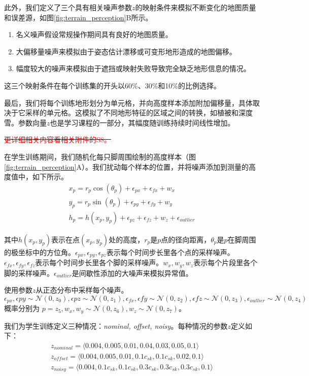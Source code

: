   此外，我们定义了三个具有相关噪声参数$z$的映射条件来模拟不断变化的地图质量和误差源，如图\ref{fig:terrain_perception}B所示。
  \begin{enumerate}
    \item 名义噪声假设常规操作期间具有良好的地图质量。
    \item 大偏移量噪声来模拟由于姿态估计漂移或可变形地形造成的地图偏移。
    \item 幅度较大的噪声来模拟由于遮挡或映射失败导致完全缺乏地形信息的情况。
  \end{enumerate}
  
  这三个映射条件在每个训练集的开头以60\%、30\%和10\%的比例选择。
  
  最后，我们将每个训练地形划分为单元格，并向高度样本添加附加偏移量，具体取决于它采样的单元格。这模拟了不同地形特征的区域之间的转换，如植被和深度雪。参数向量$z$也是学习课程的一部分，其幅度随训练持续时间线性增加。
  
  \sout{\textcolor{red}{\small 更详细相关内容看相关附件的S8。}}
  
  在学生训练期间，我们随机化每只脚周围绘制的高度样本（图\ref{fig:terrain_perception}A）。我们扰动每个样本的位置，并将噪声添加到测量的高度值中，如下所示。
  \begin{align}
    x_p=r_p\cos(\theta_p)+\epsilon_{px}+\epsilon_{fx}+w_x\\
    y_p=r_p\sin(\theta_p)+\epsilon_{py}+\epsilon_{fy}+w_y\\
    h_p=h(x_p,y_p)+\epsilon_{pz}+\epsilon_{fz}+w_z+\epsilon_{outlier}
  \end{align}
  
  其中$h(x_p,y_p)$表示在点$(x_p,y_p)$处的高度，$r_p$是$p$点的径向距离，$\theta_p$是$p$在脚周围的极坐标中的方位角。$\epsilon_{px},\epsilon_{py},\epsilon_{pz}$表示每个时间步长里各个点的采样噪声。$\epsilon_{fx},\epsilon_{fy},\epsilon_{fz}$表示每个时间步长里各个脚的采样噪声。$w_x, w_y, w_z$表示每个片段里各个脚的采样噪声。$\epsilon_{outlier}$是间歇性添加的大噪声来模拟异常值。
  
  使用参数$z$从正态分布中采样每个噪声。$\epsilon_{px},\epsilon{py}\sim \mathcal{N}(0,z_0), \epsilon{pz}\sim \mathcal{N}(0,z_1), \epsilon_{fx},\epsilon{fy}\sim \mathcal{N}(0,z_2), \epsilon{fz}\sim \mathcal{N}(0,z_3), \epsilon_{outlier}\sim \mathcal{N}(0,z_4)$ 概率分别为 $p=z_5,w_x,w_y\sim\mathcal{N}(0,z_6),w_z\sim\mathcal{N}(0,z_7)$。
  
  我们为学生训练定义三种情况：\emph{nominal, offset, noisy}。每种情况的参数$z$定义如下：
  \begin{align}
    z_{nominal}=\langle0.004, 0.005, 0.01, 0.04, 0.03,0.05, 0.1\rangle\\
    z_{offset}=\langle0.004, 0.005, 0.01, 0.1c_{sk}, 0.1c_{sk},0.02, 0.1\rangle\\
    z_{noisy}=\langle0.004, 0.1c_{sk}, 0.1c_{sk}, 0.3c_{sk}, 0.3c_{sk},0.3c_{sk}, 0.1\rangle
  \end{align}
  
